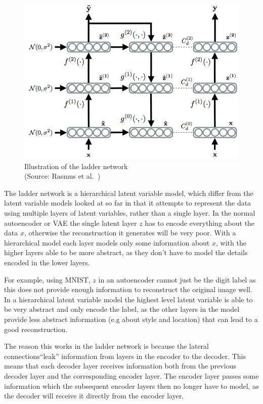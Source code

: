 \begin{figure}[H]
  \centering
  \includegraphics[scale=0.25]{figs/ladder.png}
  \caption[Illustration of the ladder network]{Illustration of the ladder network \\ (Source: Rasmus et al.~\cite{DBLP:journals/corr/RasmusVHBR15})}
  \label{fig:ladder}
\end{figure}

The ladder network is a hierarchical latent variable model, which differ from the latent variable models
looked at so far in that it attempts to represent the data using multiple layers of latent variables, rather than a 
single layer. 
In the normal autoencoder or VAE the single latent layer $z$ has to encode everything about the data $x$, otherwise the reconstruction it generates 
will be very poor. With a hierarchical model each layer models only some information about $x$, with the higher layers able to be 
more abstract, 
as they don't have to model the details encoded in the lower layers. 

For example, using MNIST, $z$ in an
autoencoder cannot just be the digit label as this does not provide enough information to reconstruct the original image well. 
In a hierarchical latent variable model the highest
level latent variable is able to be very abstract and only encode the label, as the other layers in the model provide less abstract 
information (e.g about style and location) that can lead to a good reconstruction.

The reason this works in the ladder network is because the lateral connections``leak'' information from layers in the encoder to the decoder. 
This means that each decoder layer
receives information both from the previous decoder layer and the corresponding encoder layer. The encoder layer passes some information which
the subsequent encoder layers then no longer have to model, as the decoder will receive it directly from the encoder layer.

